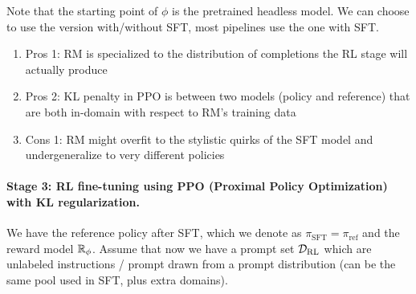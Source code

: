 \documentclass[11pt]{article}  %
\begin{document}
Note that the starting point of $\phi$ is the pretrained headless model.
We can choose to use the version with/without SFT, most pipelines use the one with SFT.
\begin{enumerate}
  \item Pros 1: RM is specialized to the distribution of completions the RL stage will actually produce
  \item Pros 2: KL penalty in PPO is between two models (policy and reference) that are both in-domain with respect to RM's training data
  \item Cons 1: RM might overfit to the stylistic quirks of the SFT model and undergeneralize to very different policies
\end{enumerate}



\paragraph{Stage 3: RL fine-tuning using PPO (Proximal Policy Optimization) with KL regularization.} 
We have the reference policy after SFT, which we denote as $\pi_{\text{SFT}} = \pi_{\text{ref}}$ and the reward model $\mathbb{R}_{\phi}$.
Assume that now we have a prompt set $\mathcal{D}_{\text{RL}}$ which are unlabeled instructions / prompt drawn from a prompt distribution (can be the same pool used in SFT, plus extra domains).
\end{document}

